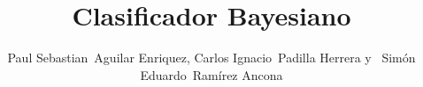 \documentclass[10pt,journal,compsoc]{IEEEtran}\usepackage[T1]{fontenc}                              %
\begin{document}
%
\title{Clasificador Bayesiano}
%
%
%
%

\author{Paul Sebastian~Aguilar Enriquez,
        Carlos Ignacio~Padilla Herrera
        y ~Simón Eduardo~Ramírez Ancona%
}

% 
%
\end{document}
